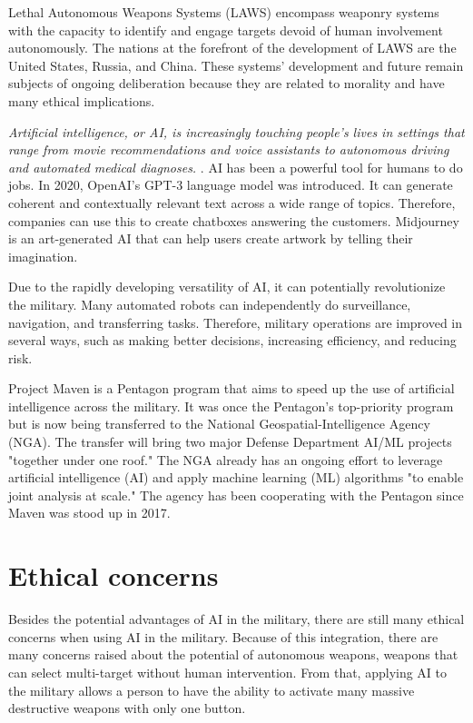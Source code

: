 \documentclass{article}
\begin{document}
Lethal Autonomous Weapons Systems (LAWS) encompass weaponry systems with the capacity to identify and engage targets devoid of human involvement autonomously. The nations at the forefront of the development of LAWS are the United States, Russia, and China. These systems' development and future remain subjects of ongoing deliberation because they are related to morality and have many ethical implications.

\textit{ Artificial intelligence, or AI, is increasingly touching people’s lives in settings that range from movie recommendations and voice assistants to autonomous driving and automated medical diagnoses.} \cite{unknown-author-2021}. AI has been a powerful tool for humans to do jobs. In 2020, OpenAI's GPT-3 language model was introduced. It can generate coherent and contextually relevant text across a wide range of topics. Therefore, companies can use this to create chatboxes answering the customers. Midjourney is an art-generated AI that can help users create artwork by telling their imagination. 


Due to the rapidly developing versatility of AI, it can potentially revolutionize the military. Many automated robots can independently do surveillance, navigation, and transferring tasks. Therefore, military operations are improved in several ways, such as making better decisions, increasing efficiency, and reducing risk.

Project Maven is a Pentagon program that aims to speed up the use of artificial intelligence across the military. It was once the Pentagon's top-priority program but is now being transferred to the National Geospatial-Intelligence Agency (NGA). The transfer will bring two major Defense Department AI/ML projects "together under one roof." The NGA already has an ongoing effort to leverage artificial intelligence (AI) and apply machine learning (ML) algorithms "to enable joint analysis at scale." The agency has been cooperating with the Pentagon since Maven was stood up in 2017. \cite{hitchens-2022}


\section{Ethical concerns}
Besides the potential advantages of AI in the military, there are still many ethical concerns when using AI in the military. Because of this integration, there are many concerns raised about the potential of autonomous weapons, weapons that can select multi-target without human intervention. From that, applying AI to the military allows a person to have the ability to activate many massive destructive weapons with only one button.  
\end{document}
